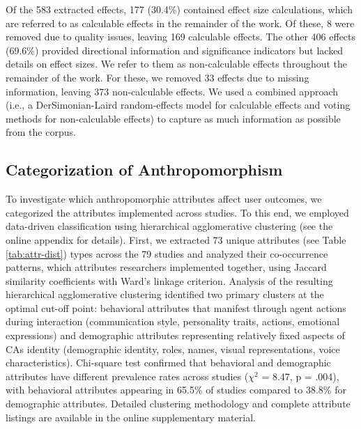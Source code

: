 \documentclass[sigconf,review,anonymous]{acmart}
\begin{document}
Of the 583 extracted effects, 177 (30.4\%) contained effect size calculations, which are referred to as calculable effects in the remainder of the work. Of these, 8 were removed due to quality issues, leaving 169 calculable effects. The other 406 effects (69.6\%) provided directional information and significance indicators but lacked details on effect sizes. We refer to them as non-calculable effects throughout the remainder of the work. For these, we removed 33 effects due to missing information, leaving 373 non-calculable effects. 
We used a combined approach (i.e., a DerSimonian-Laird random-effects model for calculable effects and voting methods for non-calculable effects) to capture as much information as possible from the corpus.

\subsection{Categorization of Anthropomorphism}

To investigate which anthropomorphic attributes affect user outcomes, we categorized the attributes implemented across studies. To this end, we employed data-driven classification using hierarchical agglomerative clustering (see the online appendix for details). First, we extracted 73 unique attributes 
(see Table \ref{tab:attr-dist}) 
types across the 79 studies and analyzed their co-occurrence patterns, which attributes researchers implemented together, using Jaccard similarity coefficients with Ward's linkage criterion. %
Analysis of the resulting hierarchical agglomerative clustering identified two primary clusters at the optimal cut-off point: behavioral attributes that manifest through agent actions during interaction (communication style, personality traits, actions, emotional expressions) and demographic attributes representing relatively fixed aspects of CAs identity (demographic identity, roles, names, visual representations, voice characteristics). Chi-square test confirmed that behavioral and demographic attributes have different prevalence rates across studies ($\chi^2$ = 8.47, p = .004), with behavioral attributes appearing in 65.5\% of studies compared to 38.8\% for demographic attributes. Detailed clustering methodology and complete attribute listings are available in the online supplementary material.
\end{document}
